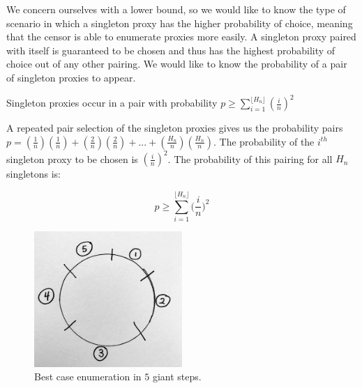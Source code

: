 We concern ourselves with a lower bound, so we would like to know the type of scenario in which a singleton proxy has the higher probability of choice, meaning that the censor is able to enumerate proxies more easily. A singleton proxy paired with itself is guaranteed to be chosen and thus has the highest probability of choice out of any other pairing. We would like to know the probability of a pair of singleton proxies to appear.

\begin{lemma}{Singleton proxies occur in a pair with probability $p \geq \sum_{i=1}^{\lfloor{H_n}\rfloor} (\frac{i}{n})^2$}


A repeated pair selection of the singleton proxies gives us the probability pairs $p=(\frac{1}{n})(\frac{1}{n}) + (\frac{2}{n})(\frac{2}{n}) + ... + (\frac{H_n}{n})(\frac{H_n}{n})$. The probability of the $i^{th}$ singleton proxy to be chosen is $(\frac{i}{n})^2$. The probability of this pairing for all $H_n$ singletons is:

$$p \geq \sum_{i=1}^{\lfloor{H_n}\rfloor} \bigg(\frac{i}{n}\bigg)^2$$

\end{lemma}
\begin{figure}[h!]
\centering
     \includegraphics[width=0.5\textwidth]{fig/giant_step_lower_bound.png}
    \caption{Best case enumeration in $5$ giant steps.}

    \label{fig:lbgs}
\end{figure}


